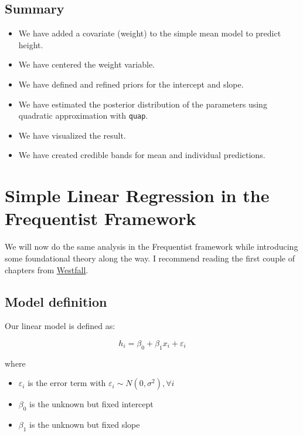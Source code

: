 \documentclass[
]{book}
\providecommand{\tightlist}{%
  \setlength{\itemsep}{0pt}\setlength{\parskip}{0pt}}
\begin{document}
\subsection{Summary}\label{summary}

\begin{itemize}
\tightlist
\item
  We have added a covariate (weight) to the simple mean model to predict height.
\item
  We have centered the weight variable.
\item
  We have defined and refined priors for the intercept and slope.
\item
  We have estimated the posterior distribution of the parameters using quadratic approximation with \texttt{quap}.
\item
  We have visualized the result.
\item
  We have created credible bands for mean and individual predictions.
\end{itemize}

\section{Simple Linear Regression in the Frequentist Framework}\label{simple-linear-regression-in-the-frequentist-framework}

We will now do the same analysis in the Frequentist framework while introducing
some foundational theory along the way.
I recommend reading the first couple of chapters from \href{https://www.routledge.com/Understanding-Regression-Analysis-A-Conditional-Distribution-Approach/Westfall-Arias/p/book/9780367493516?srsltid=AfmBOore3O_Ciecl0TTkr9AjPIY1d6OmbQa7o7IAdKpTSkD8s9HkwzD4}{Westfall}.

\subsection{Model definition}\label{model-definition-1}

Our linear model is defined as:

\[ h_i = \beta_0 + \beta_1 x_i + \varepsilon_i \]

where

\begin{itemize}
\tightlist
\item
  \(\varepsilon_i\) is the error term with \(\varepsilon_i \sim N(0, \sigma^2), \forall i\)
\item
  \(\beta_0\) is the unknown but fixed intercept
\item
  \(\beta_1\) is the unknown but fixed slope
\end{itemize}
\end{document}

